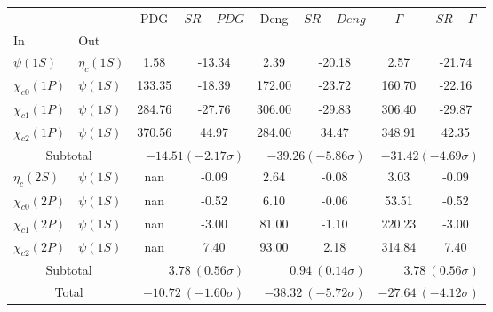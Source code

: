 \begin{tabular}{|l|l|c|c|c|c|c|c|}%
\hline%
&&PDG&$SR-PDG$&Deng&$SR-Deng$&$\Gamma$&$SR-\Gamma$\\%
In&Out&&&&&&\\%
\hline%
$\psi(1S)$&$\eta_{c}(1S)$&1.58&-13.34&2.39&-20.18&2.57&-21.74\\%
$\chi_{c0}(1P)$&$\psi(1S)$&133.35&-18.39&172.00&-23.72&160.70&-22.16\\%
$\chi_{c1}(1P)$&$\psi(1S)$&284.76&-27.76&306.00&-29.83&306.40&-29.87\\%
$\chi_{c2}(1P)$&$\psi(1S)$&370.56&44.97&284.00&34.47&348.91&42.35\\%
\hline%
\hline%
\multicolumn{2}{|c|}{Subtotal}&\multicolumn{2}{|r|}{$-14.51 (-2.17\sigma)$}&\multicolumn{2}{|r|}{$-39.26 (-5.86\sigma)$}&\multicolumn{2}{|r|}{$-31.42 (-4.69\sigma)$}\\%
\hline%
\hline%
$\eta_{c}(2S)$&$\psi(1S)$&nan&-0.09&2.64&-0.08&3.03&-0.09\\%
$\chi_{c0}(2P)$&$\psi(1S)$&nan&-0.52&6.10&-0.06&53.51&-0.52\\%
$\chi_{c1}(2P)$&$\psi(1S)$&nan&-3.00&81.00&-1.10&220.23&-3.00\\%
$\chi_{c2}(2P)$&$\psi(1S)$&nan&7.40&93.00&2.18&314.84&7.40\\%
\hline%
\hline%
\multicolumn{2}{|c|}{Subtotal}&\multicolumn{2}{|r|}{$3.78~(0.56\sigma)$}&\multicolumn{2}{|r|}{$0.94~(0.14\sigma)$}&\multicolumn{2}{|r|}{$3.78~(0.56\sigma)$}\\%
\hline%
\hline%
\multicolumn{2}{|c|}{Total}&\multicolumn{2}{|r|}{$-10.72~(-1.60\sigma)$}&\multicolumn{2}{|r|}{$-38.32~(-5.72\sigma)$}&\multicolumn{2}{|r|}{$-27.64~(-4.12\sigma)$}\\%
\hline%
\end{tabular}